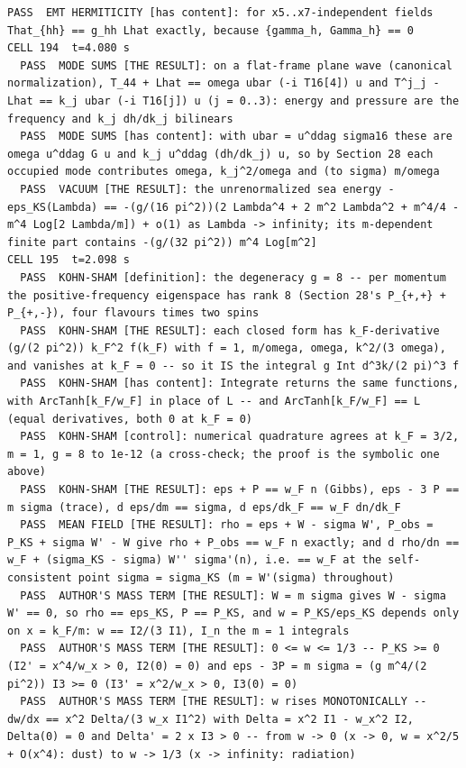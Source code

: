 \begin{Verbatim}[fontsize=\scriptsize]
  PASS  EMT HERMITICITY [has content]: for x5..x7-independent fields That_{hh} == g_hh Lhat exactly, because {gamma_h, Gamma_h} == 0
CELL 194  t=4.080 s
  PASS  MODE SUMS [THE RESULT]: on a flat-frame plane wave (canonical normalization), T_44 + Lhat == omega ubar (-i T16[4]) u and T^j_j - Lhat == k_j ubar (-i T16[j]) u (j = 0..3): energy and pressure are the frequency and k_j dh/dk_j bilinears
  PASS  MODE SUMS [has content]: with ubar = u^ddag sigma16 these are omega u^ddag G u and k_j u^ddag (dh/dk_j) u, so by Section 28 each occupied mode contributes omega, k_j^2/omega and (to sigma) m/omega
  PASS  VACUUM [THE RESULT]: the unrenormalized sea energy -eps_KS(Lambda) == -(g/(16 pi^2))(2 Lambda^4 + 2 m^2 Lambda^2 + m^4/4 - m^4 Log[2 Lambda/m]) + o(1) as Lambda -> infinity; its m-dependent finite part contains -(g/(32 pi^2)) m^4 Log[m^2]
CELL 195  t=2.098 s
  PASS  KOHN-SHAM [definition]: the degeneracy g = 8 -- per momentum the positive-frequency eigenspace has rank 8 (Section 28's P_{+,+} + P_{+,-}), four flavours times two spins
  PASS  KOHN-SHAM [THE RESULT]: each closed form has k_F-derivative (g/(2 pi^2)) k_F^2 f(k_F) with f = 1, m/omega, omega, k^2/(3 omega), and vanishes at k_F = 0 -- so it IS the integral g Int d^3k/(2 pi)^3 f
  PASS  KOHN-SHAM [has content]: Integrate returns the same functions, with ArcTanh[k_F/w_F] in place of L -- and ArcTanh[k_F/w_F] == L (equal derivatives, both 0 at k_F = 0)
  PASS  KOHN-SHAM [control]: numerical quadrature agrees at k_F = 3/2, m = 1, g = 8 to 1e-12 (a cross-check; the proof is the symbolic one above)
  PASS  KOHN-SHAM [THE RESULT]: eps + P == w_F n (Gibbs), eps - 3 P == m sigma (trace), d eps/dm == sigma, d eps/dk_F == w_F dn/dk_F
  PASS  MEAN FIELD [THE RESULT]: rho = eps + W - sigma W', P_obs = P_KS + sigma W' - W give rho + P_obs == w_F n exactly; and d rho/dn == w_F + (sigma_KS - sigma) W'' sigma'(n), i.e. == w_F at the self-consistent point sigma = sigma_KS (m = W'(sigma) throughout)
  PASS  AUTHOR'S MASS TERM [THE RESULT]: W = m sigma gives W - sigma W' == 0, so rho == eps_KS, P == P_KS, and w = P_KS/eps_KS depends only on x = k_F/m: w == I2/(3 I1), I_n the m = 1 integrals
  PASS  AUTHOR'S MASS TERM [THE RESULT]: 0 <= w <= 1/3 -- P_KS >= 0 (I2' = x^4/w_x > 0, I2(0) = 0) and eps - 3P = m sigma = (g m^4/(2 pi^2)) I3 >= 0 (I3' = x^2/w_x > 0, I3(0) = 0)
  PASS  AUTHOR'S MASS TERM [THE RESULT]: w rises MONOTONICALLY -- dw/dx == x^2 Delta/(3 w_x I1^2) with Delta = x^2 I1 - w_x^2 I2, Delta(0) = 0 and Delta' = 2 x I3 > 0 -- from w -> 0 (x -> 0, w = x^2/5 + O(x^4): dust) to w -> 1/3 (x -> infinity: radiation)

\end{Verbatim}
